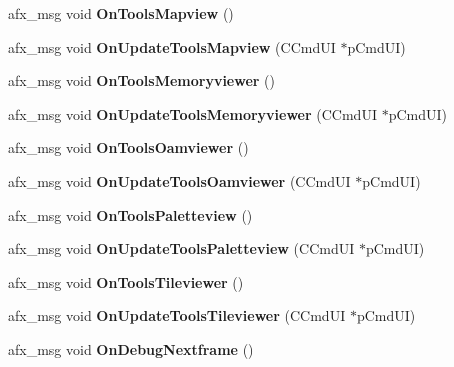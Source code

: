 \begin{DoxyCompactItemize}
afx\+\_\+msg void {\bfseries On\+Tools\+Mapview} ()
\item 
\mbox{\label{class_main_wnd_a2a5c40477c6841deb29e03e5fb0c6b5b}} 
afx\+\_\+msg void {\bfseries On\+Update\+Tools\+Mapview} (C\+Cmd\+UI $\ast$p\+Cmd\+UI)
\item 
\mbox{\label{class_main_wnd_ada5f0ce84127265d01a332262bbfe709}} 
afx\+\_\+msg void {\bfseries On\+Tools\+Memoryviewer} ()
\item 
\mbox{\label{class_main_wnd_afaa4badc2595220f6bf9c38f337fd287}} 
afx\+\_\+msg void {\bfseries On\+Update\+Tools\+Memoryviewer} (C\+Cmd\+UI $\ast$p\+Cmd\+UI)
\item 
\mbox{\label{class_main_wnd_a4509ef876a03e499fe8e676224202e63}} 
afx\+\_\+msg void {\bfseries On\+Tools\+Oamviewer} ()
\item 
\mbox{\label{class_main_wnd_afa65b90a781b4edc8122ed4673115202}} 
afx\+\_\+msg void {\bfseries On\+Update\+Tools\+Oamviewer} (C\+Cmd\+UI $\ast$p\+Cmd\+UI)
\item 
\mbox{\label{class_main_wnd_a0d76be8ae46c1e556ec0323b4373bddc}} 
afx\+\_\+msg void {\bfseries On\+Tools\+Paletteview} ()
\item 
\mbox{\label{class_main_wnd_a0866cdfcf1bbe035762b7dc45b156f98}} 
afx\+\_\+msg void {\bfseries On\+Update\+Tools\+Paletteview} (C\+Cmd\+UI $\ast$p\+Cmd\+UI)
\item 
\mbox{\label{class_main_wnd_ab456c9b37a33a87b68dc0d3ca74b0246}} 
afx\+\_\+msg void {\bfseries On\+Tools\+Tileviewer} ()
\item 
\mbox{\label{class_main_wnd_a980070c28374d525e43990697d3b10fd}} 
afx\+\_\+msg void {\bfseries On\+Update\+Tools\+Tileviewer} (C\+Cmd\+UI $\ast$p\+Cmd\+UI)
\item 
\mbox{\label{class_main_wnd_aee77d5bcdf32fa6ae1ede10345b449b3}} 
afx\+\_\+msg void {\bfseries On\+Debug\+Nextframe} ()
\item 
\mbox{\label{class_main_wnd_afa1543743f747c2a7de5f4b7a60be05b}} 

\end{DoxyCompactItemize}
